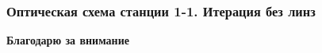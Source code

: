 \documentclass[14pt, hyperref = {colorlinks}]{beamer}
\begin{document}
\small
\begin{frame}
\frametitle{Оптическая схема станции 1-1. Итерация без линз}\label{t1}
\vspace{-20pt}
\begin{figure}[h]
\end{figure}
\vspace{-15pt}
\begin{figure}[h]
\end{figure}
\end{frame}


\begin{frame}
\begin{center}
	\textbf{Благодарю за внимание}
\end{center}
\end{frame}
\end{document}
